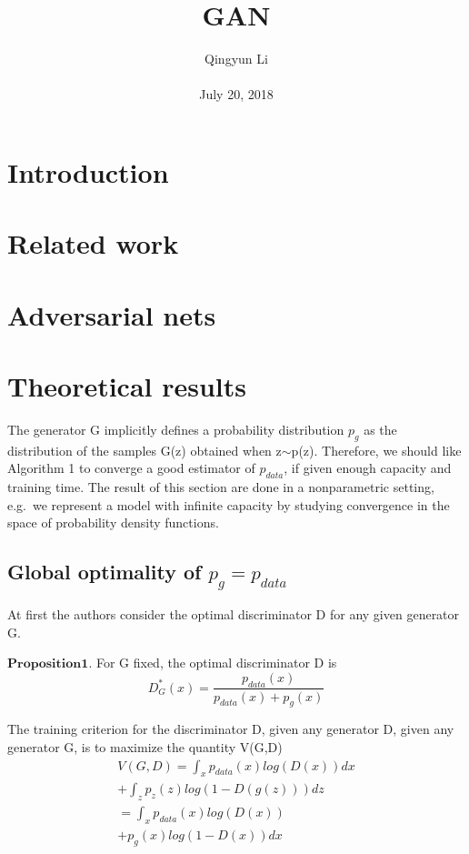 \documentclass[10pt,twocolumn,letterpaper]{article}
\begin{document}
\author{Qingyun Li\\\\
July 20, 2018}        
\title{GAN}

\maketitle

\section{Introduction}
\section{Related work}
\section{Adversarial nets}
\section{Theoretical results}
\par The generator G implicitly defines a probability distribution $p_{g}$ as the distribution of the samples G(z) obtained when z$\sim$p(z). Therefore, we should like Algorithm 1 to converge a good estimator of $p_{data}$, if given enough capacity and training time. The result of this section are done in a nonparametric setting, e.g.\ we represent a model with infinite capacity by studying convergence in the space of probability density functions.
\subsection{Global optimality of $p_{g}=p_{data}$}
\par At first the authors consider the optimal discriminator D for any given generator G.
\par $\mathbf{Proposition 1.}$ For G fixed, the optimal discriminator D is
\begin{equation}
D_{G}^{*}(x)=\frac{p_{data}(x)}{p_{data}(x)+p_{g}(x)}
\end{equation}
\par The training criterion for the discriminator D, given any generator D, given any generator G, is to maximize the quantity V(G,D)
\begin{equation}
\begin{split}
V(G,D)=\int_{x}p_{data}(x)log(D(x))dx\\
+\int_{z}p_{z}(z)log(1-D(g(z)))dz\\
=\int_{x}p_{data}(x)log(D(x))\\
+p_{g}(x)log(1-D(x))dx
\end{split}
\end{equation}
  
 
\end{document}
